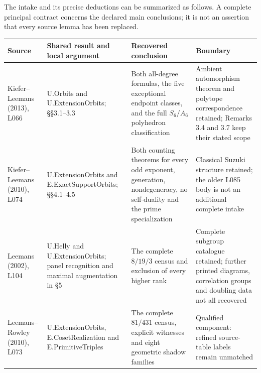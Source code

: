 \documentclass[
  11pt,
  a4paper,
]{article}
\newcounter{none} %
\begin{document}
The intake and its precise deductions can be summarized as follows. A
complete principal contract concerns the declared main conclusions; it
is not an assertion that every source lemma has been replaced.

{\def\LTcaptype{none} %
\begin{longtable}[]{@{}
  >{\raggedright\arraybackslash}p{}
  >{\raggedright\arraybackslash}p{}
  >{\raggedright\arraybackslash}p{}
  >{\raggedright\arraybackslash}p{}@{}}
\toprule\noalign{}
\begin{minipage}[b]{\linewidth}\raggedright
Source
\end{minipage} & \begin{minipage}[b]{\linewidth}\raggedright
Shared result and local argument
\end{minipage} & \begin{minipage}[b]{\linewidth}\raggedright
Recovered conclusion
\end{minipage} & \begin{minipage}[b]{\linewidth}\raggedright
Boundary
\end{minipage} \\
\midrule\noalign{}
\endhead
\bottomrule\noalign{}
\endlastfoot
Kiefer--Leemans (2013), L066 & U.Orbits and U.ExtensionOrbits;
§§3.1--3.3 & Both all-degree formulas, the five exceptional endpoint
classes, and the full \(S_6/A_6\) polyhedron classification & Ambient
automorphism theorem and polytope correspondence retained; Remarks 3.4
and 3.7 keep their stated scope \\
Kiefer--Leemans (2010), L074 & U.ExtensionOrbits and
E.ExactSupportOrbits; §§4.1--4.5 & Both counting theorems for every odd
exponent, generation, nondegeneracy, no self-duality and the prime
specialization & Classical Suzuki structure retained; the older L085
body is not an additional complete intake \\
Leemans (2002), L104 & U.Helly and U.ExtensionOrbits; panel recognition
and maximal augmentation in §5 & The complete \(8/19/3\) census and
exclusion of every higher rank & Complete subgroup catalogue retained;
further printed diagrams, correlation groups and doubling data not all
recovered \\
Leemans--Rowley (2010), L073 & U.ExtensionOrbits, E.CosetRealization and
E.PrimitiveTriples & The complete \(81/431\) census, explicit witnesses
and eight geometric shadow families & Qualified component: refined
source-table labels remain unmatched \\
\end{longtable}
}
\end{document}
